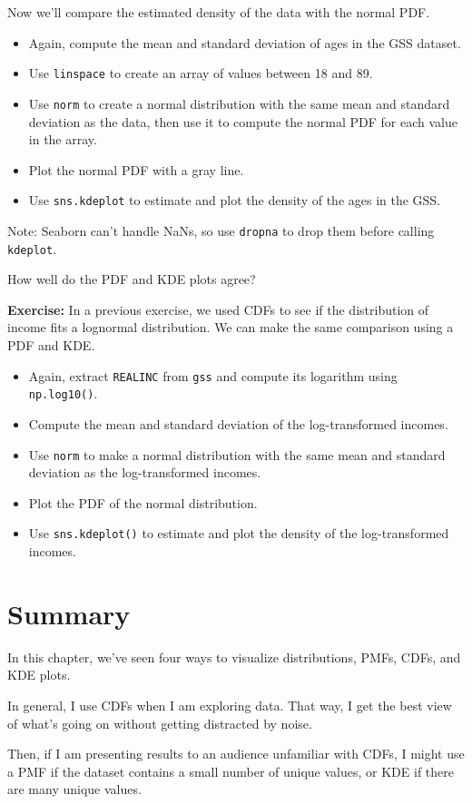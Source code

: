 Now we'll compare the estimated density of the data with the normal PDF.

\begin{itemize}
\item
  Again, compute the mean and standard deviation of ages in the GSS
  dataset.
\item
  Use \passthrough{\lstinline!linspace!} to create an array of values
  between 18 and 89.
\item
  Use \passthrough{\lstinline!norm!} to create a normal distribution
  with the same mean and standard deviation as the data, then use it to
  compute the normal PDF for each value in the array.
\item
  Plot the normal PDF with a gray line.
\item
  Use \passthrough{\lstinline!sns.kdeplot!} to estimate and plot the
  density of the ages in the GSS.
\end{itemize}

Note: Seaborn can't handle NaNs, so use \passthrough{\lstinline!dropna!}
to drop them before calling \passthrough{\lstinline!kdeplot!}.

How well do the PDF and KDE plots agree?

\textbf{Exercise:} In a previous exercise, we used CDFs to see if the
distribution of income fits a lognormal distribution. We can make the
same comparison using a PDF and KDE.

\begin{itemize}
\item
  Again, extract \passthrough{\lstinline!REALINC!} from
  \passthrough{\lstinline!gss!} and compute its logarithm using
  \passthrough{\lstinline!np.log10()!}.
\item
  Compute the mean and standard deviation of the log-transformed
  incomes.
\item
  Use \passthrough{\lstinline!norm!} to make a normal distribution with
  the same mean and standard deviation as the log-transformed incomes.
\item
  Plot the PDF of the normal distribution.
\item
  Use \passthrough{\lstinline!sns.kdeplot()!} to estimate and plot the
  density of the log-transformed incomes.
\end{itemize}

\hypertarget{summary}{%
\section{Summary}\label{summary}}

In this chapter, we've seen four ways to visualize distributions, PMFs,
CDFs, and KDE plots.

In general, I use CDFs when I am exploring data. That way, I get the
best view of what's going on without getting distracted by noise.

Then, if I am presenting results to an audience unfamiliar with CDFs, I
might use a PMF if the dataset contains a small number of unique values,
or KDE if there are many unique values.

